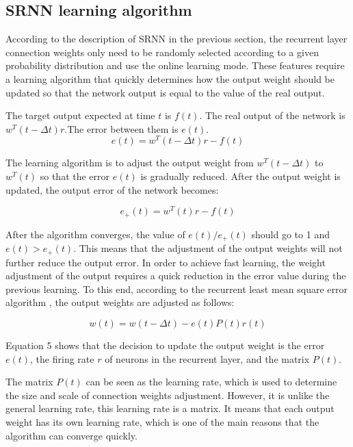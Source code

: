 \documentclass[runningheads]{llncs}
\begin{document}
\subsection{SRNN learning algorithm}
According to the description of SRNN in the previous section, 
the recurrent layer connection weights only need to be randomly 
selected according to a given probability distribution and use the 
online learning mode. These features require a learning algorithm 
that quickly determines how the output weight should be 
updated so that the network output is equal to the value of the 
real output.

The target output expected at time $t$ is $f(t)$. The real 
output of the network is $w^T (t-\Delta t) r$.The error between them is $e(t)$.
\begin{equation}
e(t)= w^T (t -\Delta t)r-f(t)
\end{equation}

The learning algorithm is to adjust the output weight 
from $w^T (t -\Delta t)$ to $w^T (t)$ so that the error $e(t)$ is gradually reduced.
After the output weight is updated, the output error of the network becomes:

\begin{equation}
e_+(t)= w^T (t)r-f(t)
\end{equation}

After the algorithm converges, the value of $e(t)/e_+ (t)$ should go to 1 and $e(t)>e_+(t)$.
This means that the adjustment of the output weights will not further 
reduce the output error. In order to achieve fast learning,
the weight adjustment of the output requires a quick reduction 
in the error value during the previous learning. To this end, 
according to the recurrent least mean square error algorithm \cite{RN23}, 
the output weights are adjusted as follows:

\begin{equation}
w(t)= w(t -\Delta t)  - e(t)P(t)r(t)
\end{equation}

Equation 5 shows that the decision to update the output weight is the 
error $e(t)$, the firing rate $r$ of neurons in  the recurrent layer, 
and the matrix $P(t)$.

The  matrix $P(t)$ can be seen as the learning rate, which is used 
to determine the size and scale of connection weights adjustment. However, it is
unlike the general learning rate, this learning rate is a matrix. 
It means that each output weight has its own learning rate, 
which is one of the main reasons that the algorithm can converge quickly.
\end{document}
